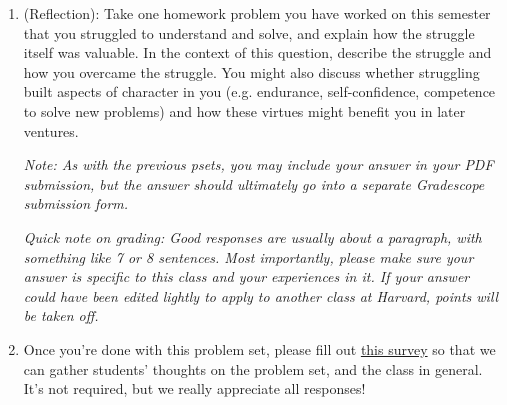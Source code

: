 \documentclass[11pt]{article}
\begin{document}
\begin{enumerate}
\begin{enumerate}
  \end{enumerate}
  
  

\item (Reflection): Take one homework problem you have worked on this semester that you struggled to understand and solve, and explain how the struggle itself was valuable.  In the context of this question, describe the struggle and how you overcame the struggle. You might also discuss whether struggling built aspects of character in you (e.g. endurance, self-confidence, competence to solve new problems) and how these virtues might benefit you in later ventures. 

 \textit{Note: As with the previous psets, you may include your answer in your PDF submission, but the answer should ultimately go into a separate Gradescope submission form.}

 \textit{Quick note on grading: Good responses are usually about a paragraph, with something like 7 or 8 sentences. Most importantly, please make sure your answer is specific to this class and your experiences in it. If your answer could have been edited lightly to apply to another class at Harvard, points will be taken off.}

\item Once you're done with this problem set, please fill out \href{https://forms.gle/pR1Mt4PmMhUfuW1G6}{this survey} so that we can gather students' thoughts on the problem set, and the class in general. It's not required, but we really appreciate all responses!
\end{enumerate}
\end{document}
